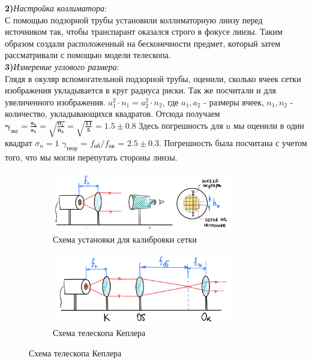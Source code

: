 \textbf{2)}\textit{Настройка коллиматора}: \\
С помощью подзорной трубы установили коллиматорную линзу перед источником так, чтобы транспарант оказался строго в фокусе линзы. Таким образом создали расположенный на бесконечности предмет, который затем рассматривали с помощью модели телескопа. \\

\textbf{3)}\textit{Измерение углового размера}: \\
Глядя в окуляр вспомогательной подзорной трубы, оценили, сколько ячеек сетки изображения укладывается в круг радиуса риски. Так же посчитали и для увеличенного изображения. $a_1^2 \cdot n_1 = a_2^2 \cdot n_2$, где $a_1, a_2$ - размеры ячеек, $n_1, n_2$ - количество, укладывающихся квадратов. Отсюда получаем $\bm{\gamma_{\text{экс}} = \frac{a_2}{a_1} = \sqrt{\frac{n_1}{n_2}} = \sqrt{\frac{11}{5}} = 1.5\pm0.8}$ Здесь погрешность для n мы оценили в один квадрат $\sigma_n = 1$  $\gamma_{\text{теор}}$ = $f_{\text{об}}/f_{\text{ок}}$ = $2.5 \pm 0.3$. Погрешность была посчитана с учетом того, что мы могли перепутать стороны линзы.\\

\begin{figure}[h!]
    \centering
    \begin{subfigure}{0.45\linewidth}
        \centering
        \includegraphics[width=8cm]{images/setup4(1).png}
        \caption{Схема установки для калибровки сетки}
    \end{subfigure}
    \hfill
    \begin{subfigure}{0.45\linewidth}
        \centering
        \includegraphics[width=8cm]{images/setup4(2).png}
        \caption{Схема телескопа Кеплера}
    \end{subfigure}
\end{figure}

